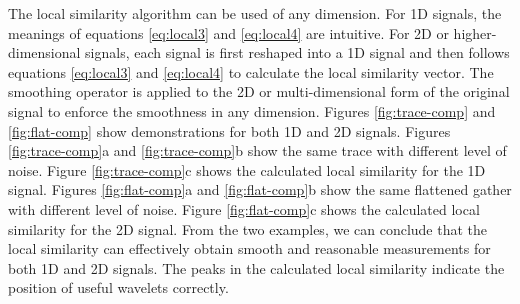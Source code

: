 The local similarity algorithm can be used    of any dimension. For 1D signals, the meanings of equations \ref{eq:local3} and \ref{eq:local4} are intuitive. For 2D or higher-dimensional signals, each signal is first reshaped into a 1D signal and then follows equations \ref{eq:local3} and \ref{eq:local4} to calculate the local similarity vector. The smoothing operator is applied to the 2D or multi-dimensional form of the original signal to enforce the smoothness in any dimension. Figures \ref{fig:trace-comp} and \ref{fig:flat-comp} show demonstrations for both 1D and 2D signals. Figures \ref{fig:trace-comp}a and \ref{fig:trace-comp}b show the same trace with different level of noise. Figure \ref{fig:trace-comp}c shows the calculated local similarity for the 1D signal. Figures \ref{fig:flat-comp}a and \ref{fig:flat-comp}b show the same flattened gather with different level of noise. Figure \ref{fig:flat-comp}c shows the calculated local similarity for the 2D signal.  From the two examples, we can conclude that the local similarity can effectively obtain smooth and reasonable measurements for both 1D and 2D signals. The peaks in the calculated local similarity indicate the position of useful wavelets correctly.

